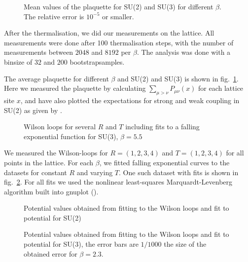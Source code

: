 \documentclass[%
 reprint,
 amsmath,amssymb,
 aps,
]{revtex4-1}
\begin{document}



\begin{figure}
	\centering
	
	\caption[Mean values of the plaquette]{Mean values of the plaquette for SU(2) and SU(3) for different $\beta$. The relative error is $10^{-5}$ or smaller.}
	\label{fig:plaquettetotal}
\end{figure}

After the thermalisation, we did our measurements on the lattice. All measurements were done after 100 thermalisation steps, with the number of measurements between $2048$ and $8192$ per $\beta$. The analysis was done with a binsize of $32$ and $200$ bootstrapsamples. 

The average plaquette for different $\beta$ and SU(2) and SU(3) is shown in fig.~\ref{fig:plaquettetotal}. Here we measured the plaquette by calculating $\sum_{\mu>\nu}P_{\mu\nu}(x)$ for each lattice site $x$, and have also plotted the expectations for strong and weak coupling in SU(2) as given by \citet{creutzsu2}.

\begin{figure}
	\centering
	
	\caption[Different Wilson loops for SU(3), $\beta=5.5$]{Wilson loops for several $R$ and $T$ including fits to a falling exponential function for SU(3), $\beta=5.5$}
	\label{fig:wilsonloopbeta5.5su3}
\end{figure} 

We measured the Wilson-loops for $R=(1,2,3,4)$ and $T=(1,2,3,4)$ for all points in the lattice. For each $\beta$, we fitted falling exponential curves to the datasets for constant $R$ and varying $T$. One such dataset with fits is shown in fig.~\ref{fig:wilsonloopbeta5.5su3}. For all fits we used the nonlinear least-squares Marquardt-Levenberg algorithm built into gnuplot (\citet{gnuplotdoc}).



\begin{figure}
	\centering
	
	\caption[Potentials obtained using SU(2)]{Potential values obtained from fitting to the Wilson loops and fit to potential for SU(2)}
	\label{fig:fittedpotentialssu2}
\end{figure} 


\begin{figure}
	\centering
	
	\caption[Potentials obtained using SU(3)]{Potential values obtained from fitting to the Wilson loops and fit to potential for SU(3), the error bars are $1/1000$ the size of the obtained error for $\beta=2.3$.}
	\label{fig:fittedpotentialssu3}
\end{figure} 
\end{document}
